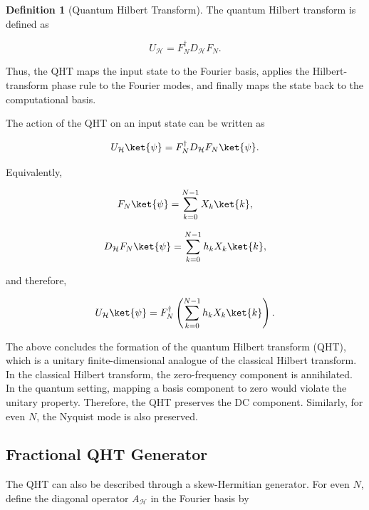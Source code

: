 \documentclass[11pt]{article}
\theoremstyle{plain}
\theoremstyle{definition}
\newtheorem{definition}{Definition}
\theoremstyle{remark}
\begin{document}
\begin{definition}[Quantum Hilbert Transform]
The quantum Hilbert transform is defined as

\begin{equation}
U_{\mathcal H}
=
F_N^\dagger D_{\mathcal H}F_N.
\end{equation}

Thus, the QHT maps the input state to the Fourier basis, applies the Hilbert-transform phase rule to the Fourier modes, and finally maps the state back to the computational basis.
\end{definition}

The action of the QHT on an input state can be written as

\begin{equation}
U_{\mathcal H}\ket{\psi}
=
F_N^\dagger D_{\mathcal H}F_N\ket{\psi}.
\end{equation}

Equivalently,

\begin{equation}
F_N\ket{\psi}
=
\sum_{k=0}^{N-1}
X_k\ket{k},
\end{equation}

\begin{equation}
D_{\mathcal H}F_N\ket{\psi}
=
\sum_{k=0}^{N-1}
h_kX_k\ket{k},
\end{equation}

and therefore,

\begin{equation}
U_{\mathcal H}\ket{\psi}
=
F_N^\dagger
\left(
\sum_{k=0}^{N-1}
h_kX_k\ket{k}
\right).
\end{equation}

The above concludes the formation of the quantum Hilbert transform (QHT), which is a unitary finite-dimensional analogue of the classical Hilbert transform. In the classical Hilbert transform, the zero-frequency component is annihilated. In the quantum setting, mapping a basis component to zero would violate the unitary property. Therefore, the QHT preserves the DC component. Similarly, for even $N$, the Nyquist mode is also preserved.

\subsection{Fractional QHT Generator}
\label{sec:fractional-qht}

The QHT can also be described through a skew-Hermitian generator. For even $N$, define the diagonal operator $A_{\mathcal H}$ in the Fourier basis by
\end{document}
